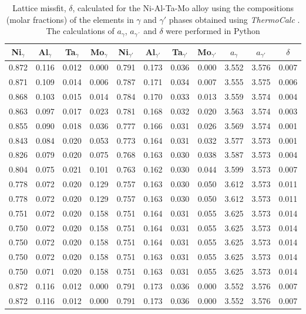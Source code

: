 \begin{table}[H]
    \centering
    \begin{tabular}{rrrrrrrrrrr}
        \multicolumn{1}{c}{Ni$_\gamma$} & \multicolumn{1}{c}{Al$_\gamma$} & \multicolumn{1}{c}{Ta$_\gamma$} & \multicolumn{1}{c}{Mo$_\gamma$} & \multicolumn{1}{c}{Ni$_{\gamma'}$} & \multicolumn{1}{c}{Al$_{\gamma'}$} & \multicolumn{1}{c}{Ta$_{\gamma'}$} & \multicolumn{1}{c}{Mo$_{\gamma'}$} & \multicolumn{1}{c}{$a_\gamma$} & \multicolumn{1}{c}{$a_{\gamma'}$} & \multicolumn{1}{c}{$\delta$} \\ \hline \hline
        0.872 & 0.116 & 0.012 & 0.000 & 0.791 & 0.173 & 0.036 & 0.000 & 3.552 & 3.576 & 0.007 \\0.871 & 0.109 & 0.014 & 0.006 & 0.787 & 0.171 & 0.034 & 0.007 & 3.555 & 3.575 & 0.006 \\0.868 & 0.103 & 0.015 & 0.014 & 0.784 & 0.170 & 0.033 & 0.013 & 3.559 & 3.574 & 0.004 \\0.863 & 0.097 & 0.017 & 0.023 & 0.781 & 0.168 & 0.032 & 0.020 & 3.563 & 3.574 & 0.003 \\0.855 & 0.090 & 0.018 & 0.036 & 0.777 & 0.166 & 0.031 & 0.026 & 3.569 & 3.574 & 0.001 \\0.843 & 0.084 & 0.020 & 0.053 & 0.773 & 0.164 & 0.031 & 0.032 & 3.577 & 3.573 & 0.001 \\0.826 & 0.079 & 0.020 & 0.075 & 0.768 & 0.163 & 0.030 & 0.038 & 3.587 & 3.573 & 0.004 \\0.804 & 0.075 & 0.021 & 0.101 & 0.763 & 0.162 & 0.030 & 0.044 & 3.599 & 3.573 & 0.007 \\0.778 & 0.072 & 0.020 & 0.129 & 0.757 & 0.163 & 0.030 & 0.050 & 3.612 & 3.573 & 0.011 \\0.778 & 0.072 & 0.020 & 0.129 & 0.757 & 0.163 & 0.030 & 0.050 & 3.612 & 3.573 & 0.011 \\0.751 & 0.072 & 0.020 & 0.158 & 0.751 & 0.164 & 0.031 & 0.055 & 3.625 & 3.573 & 0.014 \\0.750 & 0.072 & 0.020 & 0.158 & 0.751 & 0.164 & 0.031 & 0.055 & 3.625 & 3.573 & 0.014 \\0.750 & 0.072 & 0.020 & 0.158 & 0.751 & 0.164 & 0.031 & 0.055 & 3.625 & 3.573 & 0.014 \\0.750 & 0.072 & 0.020 & 0.158 & 0.751 & 0.163 & 0.031 & 0.055 & 3.625 & 3.573 & 0.014 \\0.750 & 0.071 & 0.020 & 0.158 & 0.751 & 0.163 & 0.031 & 0.055 & 3.625 & 3.573 & 0.014 \\0.872 & 0.116 & 0.012 & 0.000 & 0.791 & 0.173 & 0.036 & 0.000 & 3.552 & 3.576 & 0.007 \\0.872 & 0.116 & 0.012 & 0.000 & 0.791 & 0.173 & 0.036 & 0.000 & 3.552 & 3.576 & 0.007
    \end{tabular}
    \caption{Lattice missfit, $\delta$, calculated for the Ni-Al-Ta-Mo alloy using the compositions (molar fractions) of the elements in $\gamma$ and $\gamma'$ phases obtained using \textit{ThermoCalc} \citep{thermocalc}. The calculations of $a_\gamma$, $a_{\gamma´}$ and $\delta$ were performed in Python \citep{mygit}}
    \label{tab:tab09}
\end{table}


